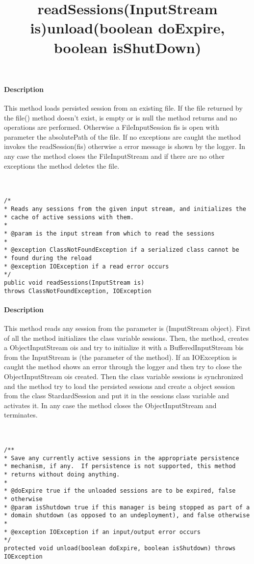 \paragraph{Description} This method loads persisted session from an existing file. If the file returned by the file() method doesn't exist, is empty or is null the method returns and no operations are performed. Otherwise a FileInputSession fis is open with parameter the absolutePath of the file. If no exceptions are caught the method invokes the readSession(fis) otherwise a error message is shown by the logger. In any case the method closes the FileInputStream and if there are no other exceptions the method deletes the file.\\\\\\


\title{{\large \textbf{readSessions(InputStream is)}}}
\lstset{firstnumber=509}
\begin{lstlisting}
/*
* Reads any sessions from the given input stream, and initializes the
* cache of active sessions with them.
*
* @param is the input stream from which to read the sessions
*
* @exception ClassNotFoundException if a serialized class cannot be
* found during the reload
* @exception IOException if a read error occurs
*/
public void readSessions(InputStream is)
throws ClassNotFoundException, IOException
\end{lstlisting}

\paragraph{Description} This method reads any session from the parameter is (ImputStream object). First of all the method initializes the class variable sessions. Then, the method, creates a ObjectInputStream ois and try to initialize it with a BufferedInputStream bis from the InputStream is (the parameter of the method). If an IOException is caught the method shows an error through the logger and then try to close the ObjectInputStream ois created. Then the class variable sessions is synchronized and the method try to load the persisted sessions and create a object session from the class StardardSession and put it in the sessions class variable and activates it. In any case the method closes the ObjectInputStream and terminates.\\\\\\


\title{{\large \textbf{unload(boolean doExpire, boolean isShutDown)}}}
\lstset{firstnumber=626}
\begin{lstlisting}
/**
* Save any currently active sessions in the appropriate persistence
* mechanism, if any.  If persistence is not supported, this method
* returns without doing anything.
*
* @doExpire true if the unloaded sessions are to be expired, false
* otherwise
* @param isShutdown true if this manager is being stopped as part of a
* domain shutdown (as opposed to an undeployment), and false otherwise
*
* @exception IOException if an input/output error occurs
*/
protected void unload(boolean doExpire, boolean isShutdown) throws IOException
\end{lstlisting}
